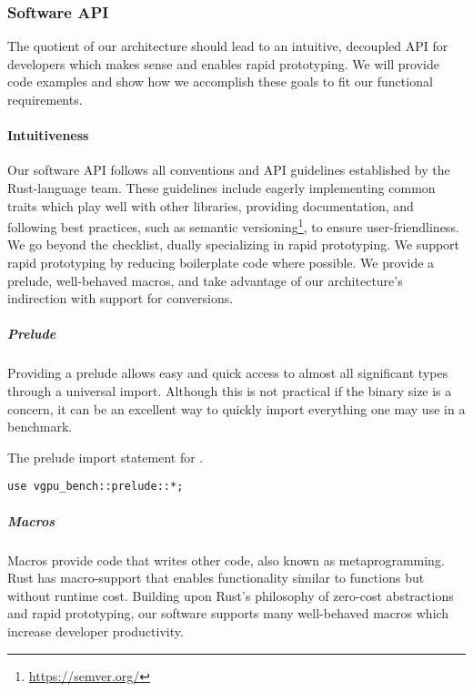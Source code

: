 \subsubsection{Software API}
The quotient of our architecture should lead to an intuitive, decoupled API for developers which makes sense and enables rapid prototyping. We will provide code examples and show how we accomplish these goals to fit our functional requirements.

\paragraph{Intuitiveness}
Our software API follows all conventions and API guidelines established by the Rust-language team\cite{ApiGuidelines22}. These guidelines include eagerly implementing common traits which play well with other libraries, providing documentation, and following best practices, such as semantic versioning\footnote{\href{https://semver.org/}{https://semver.org/}}, to ensure user-friendliness. We go beyond the checklist, dually specializing in rapid prototyping. We support rapid prototyping by reducing boilerplate code where possible. We provide a prelude, well-behaved macros, and take advantage of our architecture's indirection with support for conversions.\medskip

\subparagraph{Prelude}
Providing a prelude allows easy and quick access to almost all significant types through a universal import. Although this is not practical if the binary size is a concern, it can be an excellent way to quickly import everything one may use in a benchmark. 

\begin{snippet}
\caption{The prelude import statement for \toollinkedname.}\label{code:prelude}
\begin{verbatim}
use vgpu_bench::prelude::*;
\end{verbatim}
\end{snippet}

\subparagraph{Macros}
Macros provide code that writes other code, also known as metaprogramming. Rust has macro-support that enables functionality similar to functions but without runtime cost. Building upon Rust's philosophy of zero-cost abstractions and rapid prototyping, our software supports many well-behaved macros which increase developer productivity.\medskip

